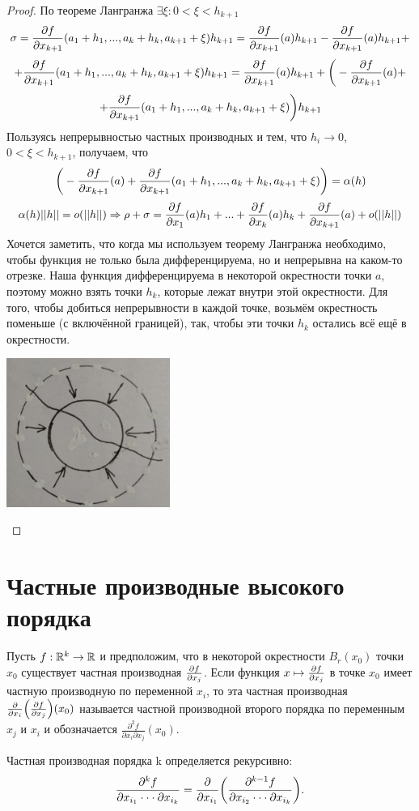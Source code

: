 \begin{proof}
    	По теореме Лангранжа $\exists \xi: 0 < \xi < h_{k + 1}$
    	\[ \sigma = \frac{\partial f}{\partial x_{k + 1}}(a_1 + h_1, ..., a_k + h_k, a_{k + 1} + \xi) h_{k + 1} = \frac{\partial f}{\partial x_{k + 1}}(a)h_{k + 1} - \frac{\partial f}{\partial x_{k + 1}}(a)h_{k + 1} + \]
    	\[ + \frac{\partial f}{\partial x_{k + 1}}(a_1 + h_1, ..., a_k + h_k, a_{k + 1} + \xi)h_{k + 1} = \frac{\partial f}{\partial x_{k + 1}}(a)h_{k + 1} + \bigg(-\frac{\partial f}{\partial x_{k + 1}}(a) + \]
    	\[ + \frac{\partial f}{\partial x_{k + 1}}(a_1 + h_1, ..., a_k + h_k, a_{k + 1} + \xi)\bigg)h_{k + 1} \]
    	Пользуясь непрерывностью частных производных и тем, что $h_i \to 0$, $0 < \xi < h_{k + 1}$, получаем, что
    	\[ \bigg(-\frac{\partial f}{\partial x_{k + 1}}(a) + \frac{\partial f}{\partial x_{k + 1}}(a_1 + h_1, ..., a_k + h_k, a_{k + 1} + \xi)\bigg) = \alpha(h) \]
    	\[ \alpha(h)||h|| = o(||h||) \Rightarrow \rho + \sigma = \frac{\partial f}{\partial x_1}(a)h_1 + ... + \frac{\partial f}{\partial x_k}(a)h_k + \frac{\partial f}{\partial x_{k + 1}}(a) + o(||h||) \]
    	Хочется заметить, что когда мы используем теорему Лангранжа необходимо, чтобы функция не только была дифференцируема, но и непрерывна на каком-то отрезке. Наша функция дифференцируема в некоторой окрестности точки $a$, поэтому можно взять точки $h_k$, которые лежат внутри этой окрестности. Для того, чтобы добиться непрерывности в каждой точке, возьмём окрестность поменьше (с включённой границей), так, чтобы эти точки $h_k$ остались всё ещё в окрестности.
    	\begin{center}
    		\includegraphics[width=0.4\textwidth]{img/lecture37/circle}
    	\end{center}
    \end{proof}
    
    \section{Частные производные высокого порядка}
    
    \begin{definition}
    	Пусть $f : \mathbb R^k \rightarrow \mathbb R$ и предположим, что в некоторой окрестности $B_r(x_0)$ точки $x_0$ существует частная производная $\pdv{f}{x_j}$. Если функция $x \mapsto \pdv{f}{x_j}$ в точке $x_0$ имеет частную производную по переменной $x_i$, то эта частная производная $\pdv{x_i}(\pdv{f}{x_j})(x_0)$ называется частной производной второго порядка по переменным $x_j$ и $x_i$ и обозначается $\frac{\partial^2 f}{\partial x_i \partial x_j}(x_0)$. 
    	    	
    	Частная производная порядка k определяется рекурсивно:
    	\[ \frac{\partial^k f}{\partial x_{i_1} \cdot \cdot \cdot \partial x_{i_k}} = \pdv{x_{i_1}}(\frac{\partial^{k - 1} f}{\partial x_{i_2} \cdot \cdot \cdot \partial x_{i_k}}). \]
    \end{definition}
    
